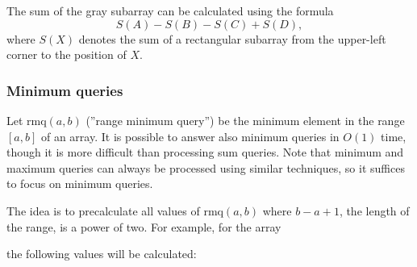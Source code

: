 The sum of the gray subarray can be calculated
using the formula
\[S(A) - S(B) - S(C) + S(D),\]
where $S(X)$ denotes the sum of a rectangular
subarray from the upper-left corner
to the position of $X$.

\subsubsection{Minimum queries}

Let $\textrm{rmq}(a,b)$ (''range minimum query'') be the
minimum element in the range $[a,b]$ of an array.
It is possible to answer also minimum queries
in $O(1)$ time, though it is more difficult than
processing sum queries.
Note that minimum and maximum queries can always
be processed using similar techniques,
so it suffices to focus on minimum queries.

The idea is to precalculate all values of $\textrm{rmq}(a,b)$
where $b-a+1$, the length of the range, is a power of two.
For example, for the array

\begin{center}
\end{center}
the following values will be calculated:

